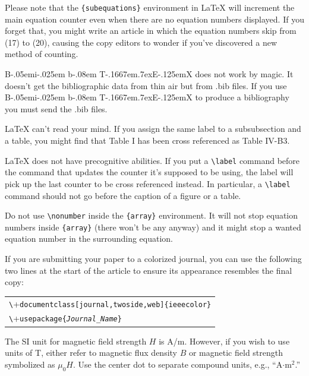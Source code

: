\documentclass[journal,twoside,web]{ieeecolor2}
\def\BibTeX{{\rm B\kern-.05em{\sc i\kern-.025em b}\kern-.08em
    T\kern-.1667em\lower.7ex\hbox{E}\kern-.125emX}}
\begin{document}
Please note that the \verb|{subequations}| environment in {\LaTeX}
will increment the main equation counter even when there are no
equation numbers displayed. If you forget that, you might write an
article in which the equation numbers skip from (17) to (20), causing
the copy editors to wonder if you've discovered a new method of
counting.

{\BibTeX} does not work by magic. It doesn't get the bibliographic
data from thin air but from .bib files. If you use {\BibTeX} to produce a
bibliography you must send the .bib files. 

{\LaTeX} can't read your mind. If you assign the same label to a
subsubsection and a table, you might find that Table I has been cross
referenced as Table IV-B3. 

{\LaTeX} does not have precognitive abilities. If you put a
\verb|\label| command before the command that updates the counter it's
supposed to be using, the label will pick up the last counter to be
cross referenced instead. In particular, a \verb|\label| command
should not go before the caption of a figure or a table.

Do not use \verb|\nonumber| inside the \verb|{array}| environment. It
will not stop equation numbers inside \verb|{array}| (there won't be
any anyway) and it might stop a wanted equation number in the
surrounding equation.

If you are submitting your paper to a colorized journal, you can use
the following two lines at the start of the article to ensure its
appearance resembles the final copy:

\smallskip\noindent
\begin{small}
\begin{tabular}{l}
\verb+\+\texttt{documentclass[journal,twoside,web]\{ieeecolor\}}\\
\verb+\+\texttt{usepackage\{\textit{Journal\_Name}\}}
\end{tabular}
\end{small}

The SI unit for magnetic field strength $H$ is A/m. However, if you wish to use 
units of T, either refer to magnetic flux density $B$ or magnetic field 
strength symbolized as $\mu _{0}H$. Use the center dot to separate 
compound units, e.g., ``A$\cdot $m$^{2}$.''
\end{document}
